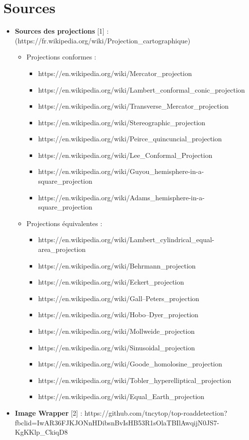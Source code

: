 \documentclass{article}
\begin{document}
\section{ Sources }


\begin{itemize}
    \item \textbf{Sources des projections} [1] : (https://fr.wikipedia.org/wiki/Projection\_cartographique)
    \begin{itemize}
        \item Projections conformes :
        \begin{itemize}
            \item https://en.wikipedia.org/wiki/Mercator\_projection
            \item https://en.wikipedia.org/wiki/Lambert\_conformal\_conic\_projection
            \item https://en.wikipedia.org/wiki/Transverse\_Mercator\_projection
            \item https://en.wikipedia.org/wiki/Stereographic\_projection
            \item https://en.wikipedia.org/wiki/Peirce\_quincuncial\_projection
            \item https://en.wikipedia.org/wiki/Lee\_Conformal\_Projection
            \item https://en.wikipedia.org/wiki/Guyou\_hemisphere-in-a-square\_projection
            \item https://en.wikipedia.org/wiki/Adams\_hemisphere-in-a-square\_projection
        \end{itemize}
        \newpage
        \item Projections équivalentes :
        \begin{itemize}
            \item https://en.wikipedia.org/wiki/Lambert\_cylindrical\_equal-area\_projection
            \item https://en.wikipedia.org/wiki/Behrmann\_projection
            \item https://en.wikipedia.org/wiki/Eckert\_projection
            \item https://en.wikipedia.org/wiki/Gall–Peters\_projection
            \item https://en.wikipedia.org/wiki/Hobo–Dyer\_projection
            \item https://en.wikipedia.org/wiki/Mollweide\_projection
            \item https://en.wikipedia.org/wiki/Sinusoidal\_projection
            \item https://en.wikipedia.org/wiki/Goode\_homolosine\_projection
            \item https://en.wikipedia.org/wiki/Tobler\_hyperelliptical\_projection
            \item https://en.wikipedia.org/wiki/Equal\_Earth\_projection
        \end{itemize}
    \end{itemize}
    \item \textbf{Image Wrapper} [2] : https://github.com/tncytop/top-roaddetection?fbclid=IwAR36FJKJONnHDibsnBvIsHB53R1sOlaTBIlAwqijN0JS7-KgKKlp\_CkiqD8
\end{itemize}
\end{document}
